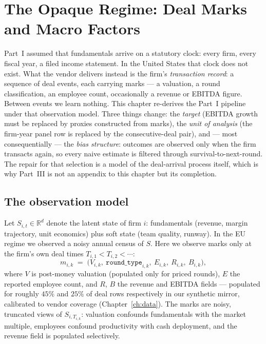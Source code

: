 \chapter{The Opaque Regime: Deal Marks and Macro Factors}
\label{ch:us}

Part~I assumed that fundamentals arrive on a statutory clock: every firm, every fiscal year,
a filed income statement. In the United States that clock does not exist. What the vendor
delivers instead is the firm's \emph{transaction record}: a sequence of deal events, each
carrying marks --- a valuation, a round classification, an employee count, occasionally a
revenue or EBITDA figure. Between events we learn nothing. This chapter re-derives the
Part~I pipeline under that observation model. Three things change: the \emph{target} (EBITDA
growth must be replaced by proxies constructed from marks), the \emph{unit of analysis} (the
firm-year panel row is replaced by the consecutive-deal pair), and --- most consequentially
--- the \emph{bias structure}: outcomes are observed only when the firm transacts again, so
every naive estimate is filtered through survival-to-next-round. The repair for that
selection is a model of the deal-arrival process itself, which is why Part~III is not an
appendix to this chapter but its completion.

\section{The observation model}
\label{sec:us-obs}

Let $S_{i,t} \in \mathbb{R}^d$ denote the latent state of firm $i$: fundamentals (revenue,
margin trajectory, unit economics) plus soft state (team quality, runway). In the EU regime
we observed a noisy annual census of $S$. Here we observe marks only at the firm's own deal
times $T_{i,1} < T_{i,2} < \cdots$:
\begin{equation}
m_{i,k} \;=\; \big(V_{i,k},\ \texttt{round\_type}_{i,k},\ E_{i,k},\ R_{i,k},\ B_{i,k}\big),
\label{eq:us-marks}
\end{equation}
where $V$ is post-money valuation (populated only for priced rounds), $E$ the reported
employee count, and $R$, $B$ the revenue and EBITDA fields --- populated for roughly $45\%$
and $25\%$ of deal rows respectively in our synthetic mirror, calibrated to vendor coverage
(Chapter~\ref{ch:data}). The marks are noisy, truncated views of $S_{i,T_{i,k}}$: valuation
confounds fundamentals with the market multiple, employees confound productivity with cash
deployment, and the revenue field is populated selectively.

